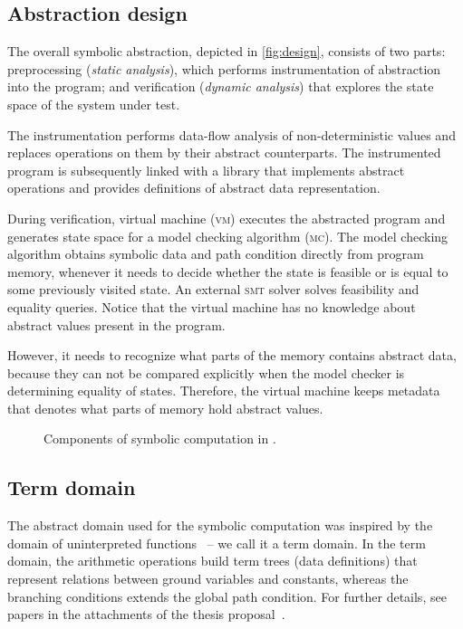 \subsection{Abstraction design}

The overall symbolic abstraction, depicted in \autoref{fig:design}, consists of
two parts: preprocessing (\emph{static analysis}), which performs
instrumentation of abstraction into the program; and verification
(\emph{dynamic analysis}) that explores the state space of the system under
test.

The instrumentation performs data-flow analysis of non-de\-ter\-ministic values and
replaces operations on them by their abstract counterparts. The instrumented
program is subsequently linked with a library that implements abstract
operations and provides definitions of abstract data representation.

During verification, virtual machine (\textsc{vm}) executes the abs\-trac\-ted
program and generates state space for a model checking algorithm (\textsc{mc}).
The model checking algorithm obtains symbolic data and path condition directly
from program memory, whenever it needs to decide whether the state is feasible
or is equal to some previously visited state. An external \textsc{smt} solver solves
feasibility and equality queries. Notice that the virtual machine has no knowledge
about abstract values present in the program.

However, it needs to recognize what parts of the memory contains abstract data,
because they can not be compared explicitly when the model checker is
determining equality of states. Therefore, the virtual machine keeps metadata
that denotes what parts of memory hold abstract values.

\begin{figure}
    \centering
    
    \caption{Components of symbolic computation in \divine.}
    \label{fig:design}
\end{figure}

\subsection{Term domain}

The abstract domain used for the symbolic computation was inspired by the
domain of uninterpreted functions~\cite{Gange2016} -- we call it a term domain.
In the term domain, the arithmetic operations build term trees (data
definitions) that represent relations between ground variables and constants,
whereas the branching conditions extends the global path condition.  For
further details, see papers in the attachments of the thesis
proposal~\cite{Lauko2018SymComp, Lauko2019Sym}.

